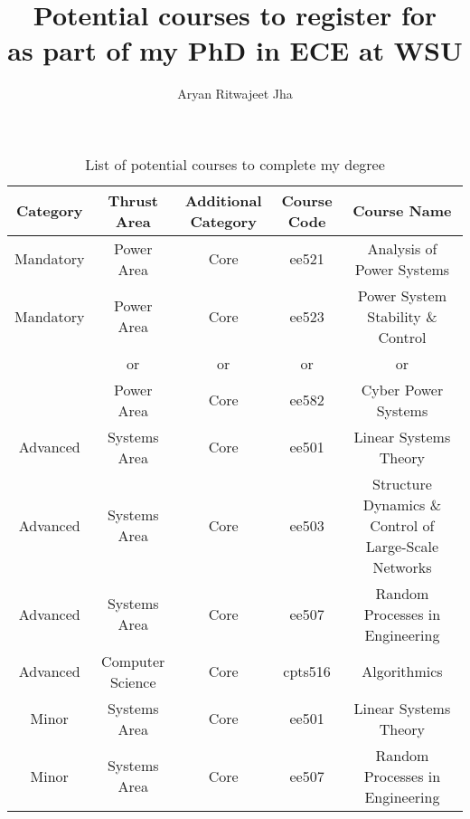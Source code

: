 \documentclass{article}
\author{Aryan Ritwajeet Jha}
\date{}
\title{Potential courses to register for \\ as part of my PhD in ECE at WSU}
\begin{document}
	\maketitle
	\begin{table}[ht]
		\caption{List of potential courses to complete my degree}
		\hspace{-40mm}
		\begin{tabular}{|c|c|c|c|c|}
			Category & Thrust Area & Additional Category & Course Code & Course Name \\
			\hline
			Mandatory & Power Area &Core& ee521 & Analysis of Power Systems \\
			Mandatory & Power Area &Core& ee523 & Power System Stability \& Control \\
			& or& or& or & or \\
			& Power Area &Core& ee582 & Cyber Power Systems \\
			Advanced & Systems Area &Core& ee501 & Linear Systems Theory \\ 
			Advanced & Systems Area &Core& ee503 & Structure Dynamics \& Control of Large-Scale Networks  \\
			Advanced& Systems Area  &Core& ee507 & Random Processes in Engineering \\
			Advanced& Computer Science &Core& cpts516 & Algorithmics \\
			Minor & Systems Area &Core& ee501 & Linear Systems Theory \\
			Minor & Systems Area &Core& ee507 & Random Processes in Engineering \\
			\hline
		\end{tabular}
	\end{table}
	
\end{document}
